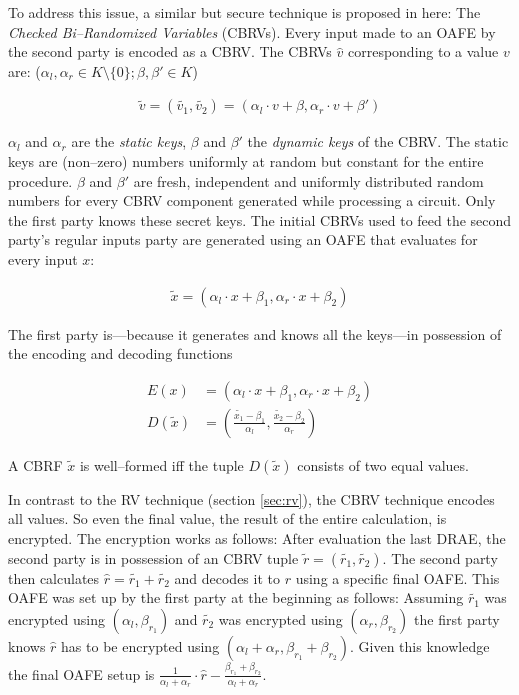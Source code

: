 To address this issue, a similar but secure technique is proposed in here: The
\emph{Checked Bi--Randomized Variables} (CBRVs). Every input made to an OAFE by
the second party is encoded as a CBRV. The CBRVs $\hat{v}$ corresponding to a
value $v$ are: ($\alpha_l, \alpha_r \in K \setminus \{0\}; \beta, \beta' \in K$)

\begin{align*}
  \widetilde{v} = (\widetilde{v_1}, \widetilde{v_2}) =
  (\alpha_l \cdot v + \beta, \alpha_r \cdot v + \beta')
\end{align*}

\noindent{} $\alpha_l$ and $\alpha_r$ are the \emph{static keys}, $\beta$ and
$\beta'$ the \emph{dynamic keys} of the CBRV. The static keys are (non--zero)
numbers uniformly at random but constant for the entire procedure. $\beta$ and
$\beta'$ are fresh, independent and uniformly distributed random numbers for
every CBRV component generated while processing a circuit. Only the first party
knows these secret keys. The initial CBRVs used to feed the second party's
regular inputs party are generated using an OAFE that evaluates for every input
$x$:

\begin{align*}
  \widetilde{x} = (\alpha_l \cdot x + \beta_1, \alpha_r \cdot x + \beta_2)
\end{align*}

The first party is---because it generates and knows all the keys---in possession
of the encoding and decoding functions

\begin{align*}
  E(x) &= \left(\alpha_l \cdot x + \beta_1, \alpha_r \cdot x + \beta_2\right) \\
  D(\widetilde{x}) &= \left(\frac{\widetilde{x_1} - \beta_1}{\alpha_l},
                       \frac{\widetilde{x_2} - \beta_2}{\alpha_r}\right)
\end{align*}

A CBRF $\widetilde{x}$ is well--formed iff the tuple $D(\widetilde{x})$ consists
of two equal values.



\label{sec:eval-final-value}

In contrast to the RV technique (section \ref{sec:rv}), the
CBRV technique encodes all values. So even the final value, the result of the
entire calculation, is encrypted. The encryption works as follows: After
evaluation the last DRAE, the second party is in possession of an CBRV tuple
$\widetilde{r} = (\widetilde{r_1}, \widetilde{r_2})$. The second party then
calculates $\widehat{r} = \widetilde{r_1} + \widetilde{r_2}$ and decodes it to
$r$ using a specific final OAFE. This OAFE was set up by the first party at the
beginning as follows: Assuming $\widetilde{r_1}$ was encrypted using $(\alpha_l,
\beta_{r_1})$ and $\widetilde{r_2}$ was encrypted using $(\alpha_r,
\beta_{r_2})$ the first party knows $\widehat{r}$ has to be encrypted using
$(\alpha_l + \alpha_r, \beta_{r_1} + \beta_{r_2})$. Given this knowledge the
final OAFE setup is $\frac{1}{\alpha_l + \alpha_r} \cdot \widehat{r} -
\frac{\beta_{r_1} + \beta_{r_2}}{\alpha_l + \alpha_r}$.


